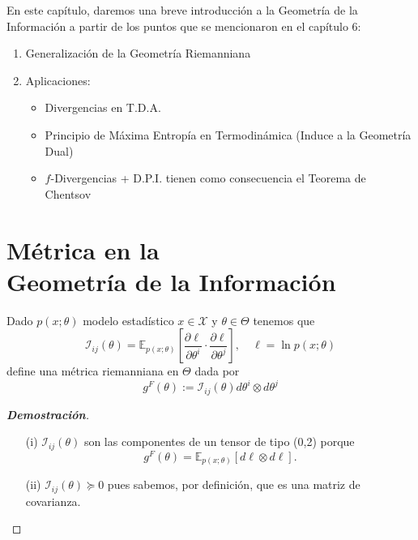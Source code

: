 En este cap\'itulo, daremos una breve introducci\'on a la Geometr\'ia de la Informaci\'on a partir de los puntos que se mencionaron en el cap\'itulo 6:

\begin{enumerate}[label=(\alph*)]
        \item Generalizaci\'on de la Geometr\'ia Riemanniana
        \item Aplicaciones:
        \begin{itemize}
            \item Divergencias en T.D.A.
            \item Principio de M\'axima Entrop\'ia en Termodin\'amica (Induce a la Geometr\'ia Dual)
            \item $f$-Divergencias + D.P.I. tienen como consecuencia el Teorema de Chentsov
        \end{itemize}
\end{enumerate}

\section{M\'etrica en la\\
Geometr\'ia de la Informaci\'on}
\begin{theorem}
Dado $p(x;\theta)$ modelo estad\'istico $x\in\mathcal{X}$ y $\theta\in\Theta$ tenemos que 
\begin{equation*}
    \mathcal{I}_{ij}(\theta)=\mathbb{E}_{p(x;\theta)}\left[\frac{\partial\ell}{\partial \theta^i}\cdot\frac{\partial\ell}{\partial\theta^j}\right],\quad\ell=\ln{p(x;\theta)}
\end{equation*}
define una m\'etrica riemanniana en $\Theta$ dada por
\begin{equation*}
    g^F(\theta):=\mathcal{I}_{ij}(\theta)d\theta^i\otimes d\theta^j
\end{equation*}
\end{theorem}

\begin{proof}[\textbf{Demostraci\'on}]
\begin{enumerate}
    \item[(i)] $\mathcal{I}_{ij}(\theta)$ son las componentes de un tensor de tipo (0,2) porque
    \begin{equation*}
        g^F(\theta)=\mathbb{E}_{p(x;\theta)}\left[d\ell\otimes d\ell\right].
    \end{equation*}
    \item[(ii)] $\mathcal{I}_{ij}(\theta)\succeq0$ pues sabemos, por definici\'on, que es una matriz de covarianza.
\end{enumerate}
\end{proof}

